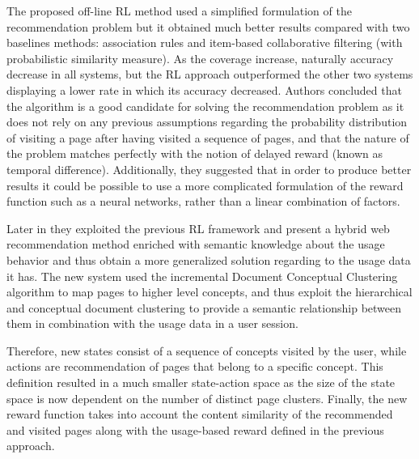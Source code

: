 The proposed off-line RL method used a simplified formulation of the recommendation problem but it obtained much better results compared with two baselines methods: association rules and item-based collaborative filtering (with probabilistic similarity measure). As the coverage increase, naturally accuracy decrease in all systems, but the RL approach outperformed the other two systems displaying a lower rate in which its accuracy decreased. Authors concluded that the algorithm is a good candidate for solving the recommendation problem as it does not rely on any previous assumptions regarding the probability distribution of visiting a page after having visited a sequence of pages, and that the nature of the problem matches perfectly with the notion of delayed reward (known as temporal difference). Additionally, they suggested that in order to produce better results it could be possible to use a more complicated formulation of the reward function such as a neural networks, rather than a linear combination of factors.

Later in \cite{taghipour2008hybrid} they exploited the previous RL framework and present a hybrid web recommendation method enriched with semantic knowledge about the usage behavior and thus obtain a more generalized solution regarding to the usage data it has. The new system used the incremental Document Conceptual Clustering\cite{godoy2006modeling} algorithm to map pages to higher level concepts, and thus exploit the hierarchical and conceptual document clustering to provide a semantic relationship between them in combination with the usage data in a user session.

Therefore, new states consist of a sequence of concepts visited by the user, while actions are recommendation of pages that belong to a specific concept. This definition resulted in a much smaller state-action space as the size of the state space is now dependent on the number of distinct page clusters. Finally, the new reward function takes into account the content similarity of the recommended and visited pages along with the usage-based reward defined in the previous approach.

%

